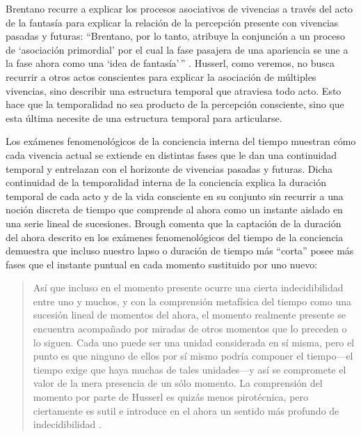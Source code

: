 Brentano recurre a explicar los procesos asociativos de vivencias a
través del acto de la fantasía para explicar la relación de la
percepción presente con vivencias pasadas y futuras: ``Brentano, por lo
tanto, atribuye la conjunción a un proceso de `asociación primordial'
por el cual la fase pasajera de una apariencia se une a la fase ahora
como una `idea de fantasía'\,'' \cite[p.~188]{morrison1970}. Husserl, como
veremos, no busca recurrir a otros actos conscientes para explicar la
asociación de múltiples vivencias, sino describir una estructura
temporal que atraviesa todo acto. Esto hace que la temporalidad no sea
producto de la percepción consciente, sino que esta última necesite de
una estructura temporal para articularse.

Los exámenes fenomenológicos de la conciencia interna del tiempo
muestran cómo cada vivencia actual se extiende en distintas fases que le
dan una continuidad temporal y entrelazan con el horizonte de vivencias
pasadas y futuras. Dicha continuidad de la temporalidad interna de la
conciencia explica la duración temporal de cada acto y de la vida
consciente en su conjunto sin recurrir a una noción discreta de tiempo
que comprende al ahora como un instante aislado en una serie lineal de
sucesiones. Brough comenta que la captación de la duración del ahora
descrito en los exámenes fenomenológicos del tiempo de la conciencia
demuestra que incluso nuestro lapso o duración de tiempo más ``corta''
posee más fases que el instante puntual en cada momento sustituido por
uno nuevo:

\begin{quote}
Así que incluso en el momento presente ocurre una cierta indecidibilidad
entre uno y muchos, y con la comprensión metafísica del tiempo como una
sucesión lineal de momentos del ahora, el momento realmente presente se
encuentra acompañado por miradas de otros momentos que lo preceden o lo
siguen. Cada uno puede ser una unidad considerada en sí misma, pero el
punto es que ninguno de ellos por sí mismo podría componer el
tiempo---el tiempo exige que haya muchas de tales unidades---y así se
compromete el valor de la mera presencia de un sólo momento. La
comprensión del momento por parte de Husserl es quizás menos
pirotécnica, pero ciertamente es sutil e introduce en el ahora un
sentido más profundo de indecidibilidad \cite[p.~517]{brough1993}.
\end{quote}

